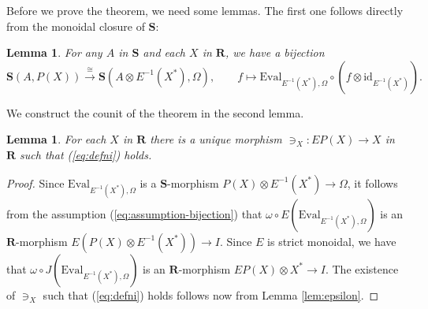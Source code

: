 \documentclass[12pt]{tac}
\newtheorem{lemma}[theorem]{Lemma}
\theoremstyle{definition}
\theoremstyle{remark}
\newcommand{\<}{\langle}
\renewcommand{\>}{\rangle}
\renewcommand{\:}{\colon}
\newcommand{\Eval}{\mathrm{Eval}}
\newcommand{\id}{\mathrm{id}}
\begin{document}
Before we prove the theorem, we need some lemmas. The first one follows directly from the monoidal closure of $\mathbf S$:
\begin{lemma}\label{lem:eval}
For any $A$ in $\mathbf S$ and each $X$ in $\mathbf R$, we have a bijection
\[ \mathbf S(A,P(X))\xrightarrow{\cong} \mathbf S(A\otimes E^{-1}(X^*),\Omega), \qquad f\mapsto\Eval_{E^{-1}(X^*),\Omega}\circ (f\otimes \id_{E^{-1}(X^*)}).\]
\end{lemma}
We construct the counit of the theorem in the second lemma.
\begin{lemma}\label{lem:ni}
    For each $X$ in $\mathbf R$ there is a unique morphism $\ni_X:EP(X)\to X$ in $\mathbf R$ such that (\ref{eq:defni}) holds. 
\end{lemma}
\begin{proof}
    Since $\Eval_{E^{-1}(X^*),\Omega}$ is a $\mathbf S$-morphism $P(X)\otimes E^{-1}(X^*)\to\Omega$, it follows from the assumption (\ref{eq:assumption-bijection}) that $\omega\circ E(\Eval_{E^{-1}(X^*),\Omega})$ is an $\mathbf R$-morphism $E(P(X)\otimes E^{-1}(X^*))\to I$. Since $E$ is strict monoidal, we have that $\omega\circ J(\Eval_{E^{-1}(X^*),\Omega})$ is an $\mathbf R$-morphism $EP(X)\otimes X^*\to I$. The existence of $\ni_X$ such that (\ref{eq:defni}) holds follows now from Lemma \ref{lem:epsilon}.
\end{proof}
\end{document}
